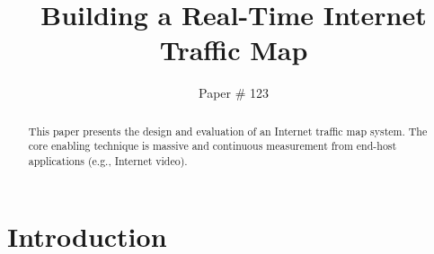 \documentclass[10pt,twocolumn]{article}
\begin{document}
\title{\bf Building a Real-Time Internet Traffic Map}
\author{Paper \# 123}
\date{}
\maketitle
\thispagestyle{empty}


\maketitle 

\begin{abstract}
This paper presents the design and evaluation of an Internet traffic map system. The core enabling technique is massive and continuous measurement from end-host applications (e.g., Internet video).
\end{abstract}

\section{Introduction}
\end{document}
